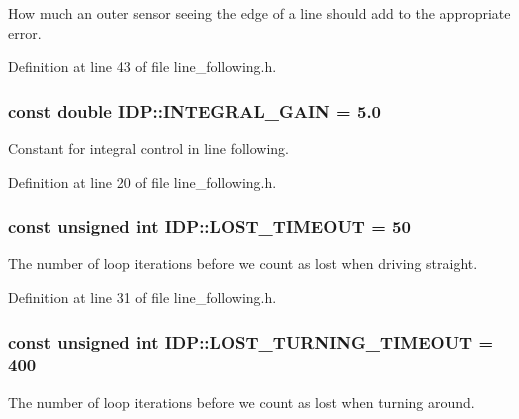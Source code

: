 How much an outer sensor seeing the edge of a line should add to the appropriate error. 



Definition at line 43 of file line\_\-following.h.

\hypertarget{namespaceIDP_a9107eef10d68ba30176633afd87f1ed4}{
\subsubsection[{INTEGRAL\_\-GAIN}]{\setlength{\rightskip}{0pt plus 5cm}const double {\bf IDP::INTEGRAL\_\-GAIN} = 5.0}}
\label{namespaceIDP_a9107eef10d68ba30176633afd87f1ed4}


Constant for integral control in line following. 



Definition at line 20 of file line\_\-following.h.

\hypertarget{namespaceIDP_ac845248570cca0705d43e2dbb085c3cb}{
\subsubsection[{LOST\_\-TIMEOUT}]{\setlength{\rightskip}{0pt plus 5cm}const unsigned int {\bf IDP::LOST\_\-TIMEOUT} = 50}}
\label{namespaceIDP_ac845248570cca0705d43e2dbb085c3cb}


The number of loop iterations before we count as lost when driving straight. 



Definition at line 31 of file line\_\-following.h.

\hypertarget{namespaceIDP_a518ca50cb25167a9930b2099282bb938}{
\subsubsection[{LOST\_\-TURNING\_\-TIMEOUT}]{\setlength{\rightskip}{0pt plus 5cm}const unsigned int {\bf IDP::LOST\_\-TURNING\_\-TIMEOUT} = 400}}
\label{namespaceIDP_a518ca50cb25167a9930b2099282bb938}


The number of loop iterations before we count as lost when turning around. 



